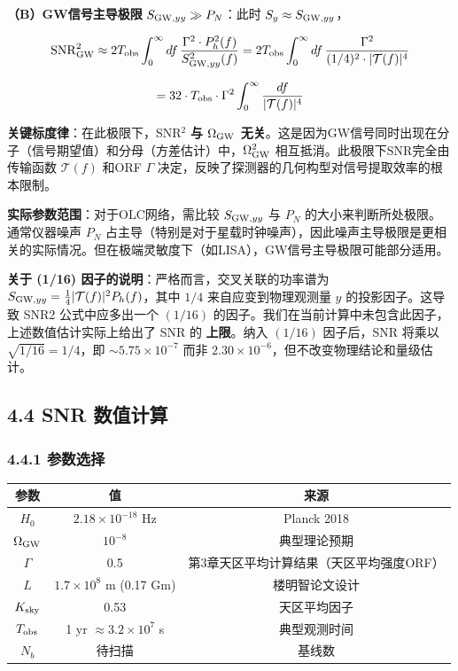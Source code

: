 \documentclass[12pt,a4paper]{article}
\begin{document}
\textbf{（B）GW信号主导极限} $S_{{\rm GW},yy} \gg P_N$：此时 $S_y \approx S_{{\rm GW},yy}$，

$${\rm SNR}^2_{\rm GW} \approx 2 T_{\rm obs} \int_0^\infty df\, \frac{\Gamma^2 \cdot P_h^2(f)}{S_{{\rm GW},yy}^2(f)} = 2 T_{\rm obs} \int_0^\infty df\, \frac{\Gamma^2}{(1/4)^2 \cdot |\mathcal{T}(f)|^4}$$

$$= 32 \cdot T_{\rm obs} \cdot \Gamma^2 \int_0^\infty \frac{df}{|\mathcal{T}(f)|^4}$$

\textbf{关键标度律}：在此极限下，SNR$^2$ \textbf{与 $\Omega_{\rm GW}$ 无关}。这是因为GW信号同时出现在分子（信号期望值）和分母（方差估计）中，$\Omega_{\rm GW}^2$ 相互抵消。此极限下SNR完全由传输函数 $\mathcal{T}(f)$ 和ORF $\Gamma$ 决定，反映了探测器的几何构型对信号提取效率的根本限制。

\textbf{实际参数范围}：对于OLC网络，需比较 $S_{{\rm GW},yy}$ 与 $P_N$ 的大小来判断所处极限。通常仪器噪声 $P_N$ 占主导（特别是对于星载时钟噪声），因此噪声主导极限是更相关的实际情况。但在极端灵敏度下（如LISA），GW信号主导极限可能部分适用。

\textbf{关于 (1/16) 因子的说明}：严格而言，交叉关联的功率谱为 $S_{{\rm GW},yy} = \frac{1}{4}|\mathcal{T}(f)|^2 P_h(f)$，其中 $1/4$ 来自应变到物理观测量 $y$ 的投影因子。这导致 SNR2 公式中应多出一个 $(1/16)$ 的因子。我们在当前计算中未包含此因子，上述数值估计实际上给出了 SNR 的 \textbf{上限}。纳入 $(1/16)$ 因子后，SNR 将乘以 $\sqrt{1/16} = 1/4$，即 $\sim 5.75\times 10^{-7}$ 而非 $2.30\times 10^{-6}$，但不改变物理结论和量级估计。

\subsection{4.4 SNR 数值计算}


\subsubsection{4.4.1 参数选择}


\begin{tabular}{|c|c|c|}
\hline
参数 & 值 & 来源 \\
\hline
$H_0$ & $2.18 \times 10^{-18}$ Hz & Planck 2018 \\
$\Omega_{\rm GW}$ & $10^{-8}$ & 典型理论预期 \\
$\Gamma$ & 0.5 & 第3章天区平均计算结果（天区平均强度ORF） \\
$L$ & $1.7 \times 10^8$ m (0.17 Gm) & 楼明智论文设计 \\
$K_{\rm sky}$ & 0.53 & 天区平均因子 \\
$T_{\rm obs}$ & 1 yr $\approx 3.2 \times 10^7$ s & 典型观测时间 \\
$N_b$ & 待扫描 & 基线数 \\
\hline
\end{tabular}
\end{document}
